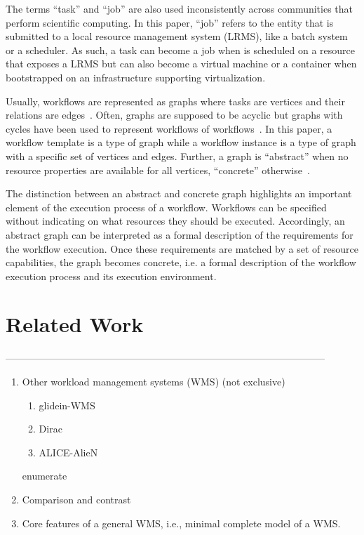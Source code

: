 \documentclass[10pt, conference, compsocconf]{IEEEtran}
\begin{document}
The terms ``task'' and ``job'' are also used inconsistently across communities
that perform scientific computing. In this paper, ``job'' refers to the entity
that is submitted to a local resource management system (LRMS), like a batch
system or a scheduler. As such, a task can become a job when is scheduled on a
resource that exposes a LRMS but can also become a virtual machine or a
container when bootstrapped on an infrastructure supporting virtualization.

Usually, workflows are represented as graphs where tasks are vertices and
their relations are edges~\cite{}. Often, graphs are supposed to be acyclic
but graphs with cycles have been used to represent workflows of
workflows~\cite{}. In this paper, a workflow template is a type of graph while
a workflow instance is a type of graph with a specific set of vertices and
edges. Further, a graph is ``abstract'' when no resource properties are
available for all vertices, ``concrete'' otherwise~\cite{}.

The distinction between an abstract and concrete graph highlights an important
element of the execution process of a workflow. Workflows can be specified
without indicating on what resources they should be executed. Accordingly, an
abstract graph can be interpreted as a formal description of the requirements
for the workflow execution. Once these requirements are matched by a set of
resource capabilities, the graph becomes concrete, i.e. a formal description
of the workflow execution process and its execution environment.

\section{Related Work}
\label{sec:related}

--------------------------------------------------------------------------------------------------
\begin{enumerate}
  \item Other workload management systems (WMS) (not exclusive)
  \begin{enumerate}
    \item glidein-WMS
    \item Dirac
    \item ALICE-AlieN
  \end{enumerate}
{enumerate}
  \item Comparison and contrast
  \item Core features of a general WMS, i.e., minimal complete model of a WMS.
\end{enumerate}
\end{document}

